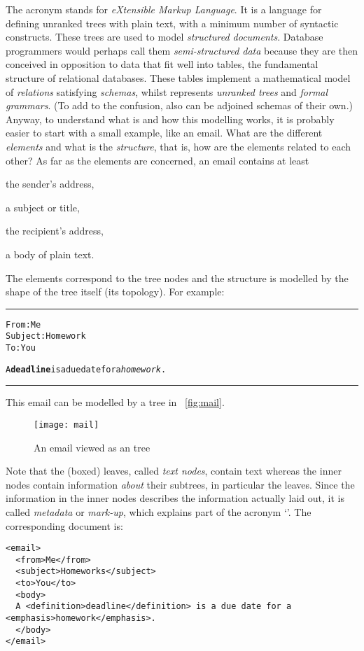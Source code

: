 \mypar{\XML}

The acronym \XML stands for \emph{eXtensible Markup Language}. It is a
language for defining unranked trees with plain text, with a minimum
number of syntactic constructs. These trees are used to model
\emph{structured documents}. Database programmers would perhaps call
them \emph{semi\hyp{}structured data} because they are then conceived
in opposition to data that fit well into tables, the fundamental
structure of relational databases. These tables implement a
mathematical model of \emph{relations} satisfying \emph{schemas},
whilst \XML represents \emph{unranked trees} and \emph{formal
  grammars}. (To add to the confusion, \XML also can be adjoined
schemas of their own.)  Anyway, to understand what \XML is and how
this modelling works, it is probably easier to start with a small
example, like an email.  What are the different \emph{elements} and
what is the \emph{structure}, that is, how are the elements related to
each other? As far as the elements are concerned, an email contains at
least
\begin{itemize*}

  \item the sender's address,

  \item a subject or title,

  \item the recipient's address,

  \item a body of plain text.

\end{itemize*}
The elements correspond to the tree nodes and the structure is modelled
by the shape of the tree itself (its topology). For example:

\noindent\rule{\linewidth}{0.5pt}
\begin{alltt}
From: Me
Subject: Homework
To: You

  A \textbf{deadline} is a due date for a \emph{homework}.
\end{alltt}
\rule{\linewidth}{0.5pt}
\medskip
This email can be modelled by a tree in \fig~\vref{fig:mail}.
\begin{figure}
\centering
\texttt{[image: mail]}
\caption{An email viewed as an \XML tree\label{fig:mail}}
\end{figure}
Note that the (boxed) leaves, called \emph{text nodes}, contain text
whereas the inner nodes contain information \emph{about} their
subtrees, in particular the leaves. Since the information in the inner
nodes describes the information actually laid out, it is called
\emph{metadata} or \emph{mark\hyp{}up}, which explains part of the
acronym `\XML'. The corresponding \XML document is:
\begin{verbatim}
<email>
  <from>Me</from>
  <subject>Homeworks</subject>
  <to>You</to>
  <body>
  A <definition>deadline</definition> is a due date for a
<emphasis>homework</emphasis>.
  </body>
</email>
\end{verbatim}

